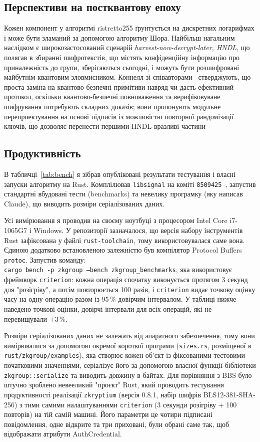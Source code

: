 \subsection{Перспективи на постквантову епоху}
Кожен компонент у алгоритмі ristretto255 ґрунтується на дискретних логарифмах і може бути зламаний за допомогою 
алгоритму Шора. Найбільш нагальним наслідком є широкозастосований сценарій \emph{harvest-now-decrypt-later, HNDL}, 
що полягав в збиранні шифротекстів, що містять конфіденційну інформацію про приналежність до групи, зберігаються 
сьогодні, і можуть бути розшифровані майбутнім квантовим зловмисником. Коннелл зі співавторами~\cite{Connell26} 
стверджують, що проста заміна на квантово-безпечні примітиви навряд чи дасть ефективний протокол, оскільки 
квантово-безпечні повноваження та верифіковуване шифрування потребують складних доказів; вони пропонують модульне 
перепроектування на основі підписів із можливістю повторної рандомізації ключів, що дозволяє перенести першими 
HNDL-вразливі частини

\subsection{Продуктивність}
\label{sec:perf}
В табличці~\ref{tab:bench} я зібрав опубліковані результати тестування і власні запуски алгоритму на Rust. 
Комплілював \texttt{libsignal} на коміті \texttt{8509425}~\cite{libsignal}, запустив стандартні вбудовані тести 
(benchmarks) та невелику програмку (яку написав Claude), що виводить розміри серіалізованих даних.

Усі вимірювання я проводив на своєму ноутбуці з процесором Intel Core i7-1065G7 і Windows. У репозиторії зазначалося, 
що версія набору інструментів Rust зафіксована у файлі \texttt{rust-toolchain}, тому використовувалася саме вона. 
Єдиною додатково встановленою залежністю був компілятор Protocol Buffers \texttt{protoc}. Запустив команду: \\
\texttt{cargo bench -p zkgroup --bench zkgroup\_benchmarks}, яка використовує фреймворк \texttt{criterion}: 
кожна операція спочатку виконується протягом 3 секунд для "розігріву"{}, а потім повторюється 100 разів, і 
\texttt{criterion} видає точкову оцінку часу на одну операцію разом із 95\,\% довірчим інтервалом. У таблиці 
нижче наведено точкові оцінки, довірчі інтервали для всіх операцій, які не перевищували $\pm 3\,\%$.

Розміри серіалізованих даних не залежать від апаратного забезпечення, тому вони вимірювалися за допомогою окремої 
короткої програми (\texttt{sizes.rs}, розміщеної в \texttt{rust/zkgroup/examples}), яка створює кожен об'єкт із 
фіксованими тестовими початковими значеннями, серіалізує його за допомогою власної функції бібліотеки 
\texttt{zkgroup::serialize} та виводить довжину в байтах. Для порівняння з BBS було штучно зроблено невееликий 
"проєкт"{} Rust, який проводить тестування продуктивності реалізації \texttt{zkryptium} (версія 0.8.1, набір 
шифрів BLS12-381-SHA-256) з тими самими налаштуваннями \texttt{criterion} (3 секунди розігріву + 100 повторів) 
на тій самій машині. Його параметри це чотири підписані повідомлення, одне відкрите та три приховані, були обрані 
саме так, щоб відображати атрибути AuthCredential.

